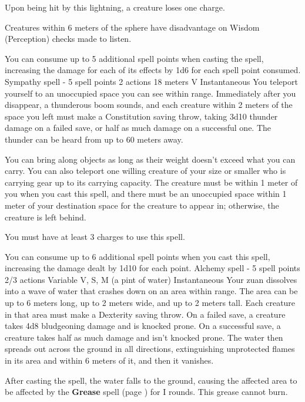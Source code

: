     Upon being hit by this lightning, a creature loses one charge.

    Creatures within 6 meters of the sphere have disadvantage on Wisdom (Perception) checks made to listen.

    You can consume up to 5 additional spell points when casting the spell, increasing the damage for each of its effects by 1d6 for each spell point consumed.
    {Sympathy spell - 5 spell points}
    {2 actions}
    {18 meters}
    {V}
    {Instantaneous}
    You teleport yourself to an unoccupied space you can see within range.
    Immediately after you disappear, a thunderous boom sounds, and each creature within 2 meters of the space you left must make a Constitution saving throw, taking 3d10 thunder damage on a failed save, or half as much damage on a successful one.
    The thunder can be heard from up to 60 meters away.

    You can bring along objects as long as their weight doesn't exceed what you can carry.
    You can also teleport one willing creature of your size or smaller who is carrying gear up to its carrying capacity.
    The creature must be within 1 meter of you when you cast this spell, and there must be an unoccupied space within 1 meter of your destination space for the creature to appear in; otherwise, the creature is left behind.

    You must have at least 3 charges to use this spell.

    You can consume up to 6 additional spell points when you cast this spell, increasing the damage dealt by 1d10 for each point.
    {Alchemy spell - 5 spell points}
    {2/3 actions}
    {Variable}
    {V, S, M (a pint of water)}
    {Instantaneous}
    Your zuan dissolves into a wave of water that crashes down on an area within range.
    The area can be up to 6 meters long, up to 2 meters wide, and up to 2 meters tall.
    Each creature in that area must make a Dexterity saving throw.
    On a failed save, a creature takes 4d8 bludgeoning damage and is knocked prone.
    On a successful save, a creature takes half as much damage and isn't knocked prone.
    The water then spreads out across the ground in all directions, extinguishing unprotected flames in its area and within 6 meters of it, and then it vanishes.

    After casting the spell, the water falls to the ground, causing the affected area to be affected by the \textbf{Grease} spell (page \pageref{spell::grease}) for I rounds.
    This grease cannot burn.

